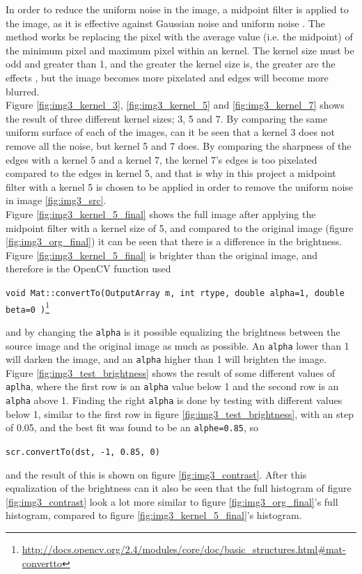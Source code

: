 In order to reduce the uniform noise in the image, a midpoint filter is applied to the image, as it is effective against Gaussian noise and uniform noise . The method works be replacing the pixel with the average value (i.e. the midpoint) of the minimum pixel and maximum pixel within an kernel.  The kernel size must be odd and greater than 1, and the greater the kernel size is, the greater are the effects , but the image becomes more pixelated and edges will become more blurred.  \\[0.2cm]
Figure \ref{fig:img3_kernel_3}, \ref{fig:img3_kernel_5} and \ref{fig:img3_kernel_7} shows the result of three different kernel sizes; 3, 5 and 7. By comparing the same uniform surface of each of the images, can it be seen that a kernel 3 does not remove all the noise, but kernel 5 and 7 does. By comparing the sharpness of the edges with a kernel 5 and a kernel 7, the kernel 7's edges is too pixelated compared to the edges in kernel 5, and that is why in this project a midpoint filter with a kernel 5 is chosen to be applied in order to remove the uniform noise in image \ref{fig:img3_src}.\\[0.2cm]
Figure \ref{fig:img3_kernel_5_final} shows the full image after applying the midpoint filter with a kernel size of 5, and compared to the original image (figure \ref{fig:img3_org_final}) it can be seen that there is a difference in the brightness. Figure \ref{fig:img3_kernel_5_final} is brighter than the original image, and therefore is the OpenCV function used
\begin{center}
\lstinline|void Mat::convertTo(OutputArray m, int rtype, double alpha=1, double beta=0 )|\footnote{\url{http://docs.opencv.org/2.4/modules/core/doc/basic_structures.html\#mat-convertto}}
\end{center}
and by changing the \lstinline|alpha| is it possible equalizing the brightness between the source image and the original image as much as possible. An \lstinline|alpha| lower than 1 will darken the image, and an \lstinline|alpha| higher than 1 will brighten the image. Figure \ref{fig:img3_test_brightness} shows the result of some different values of \lstinline|aplha|, where the first row is an \lstinline|alpha| value below 1 and the second row is an \lstinline|alpha| above 1. Finding the right \lstinline|alpha| is done by testing with different values below 1, similar to the first row in figure \ref{fig:img3_test_brightness}, with an step of 0.05, and the best fit was found to be an \lstinline|alphe=0.85|, so 
\begin{center}
\lstinline|scr.convertTo(dst, -1, 0.85, 0)|
\end{center}
and the result of this is shown on figure \ref{fig:img3_contrast}. After this equalization  of the brightness can it also be seen that the full histogram of figure \ref{fig:img3_contrast} look a lot more similar to figure \ref{fig:img3_org_final}'s full histogram, compared to figure \ref{fig:img3_kernel_5_final}'s histogram.

